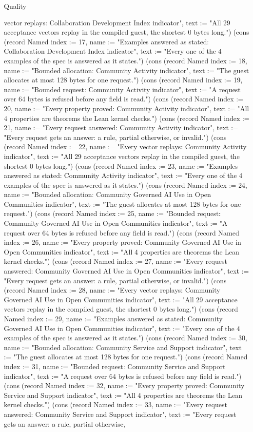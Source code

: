 \begin{lexlean}{Quality}
\begin{semanticmodule}
{vector replays: Collaboration Development Index indicator", text := "All 29 acceptance vectors replay in the compiled guest, the shortest 0 bytes long."}) (cons (record Named {index := 17, name := "Examples answered as stated: Collaboration Development Index indicator", text := "Every one of the 4 examples of the spec is answered as it states."}) (cons (record Named {index := 18, name := "Bounded allocation: Community Activity indicator", text := "The guest allocates at most 128 bytes for one request."}) (cons (record Named {index := 19, name := "Bounded request: Community Activity indicator", text := "A request over 64 bytes is refused before any field is read."}) (cons (record Named {index := 20, name := "Every property proved: Community Activity indicator", text := "All 4 properties are theorems the Lean kernel checks."}) (cons (record Named {index := 21, name := "Every request answered: Community Activity indicator", text := "Every request gets an answer: a rule, partial otherwise, or invalid."}) (cons (record Named {index := 22, name := "Every vector replays: Community Activity indicator", text := "All 29 acceptance vectors replay in the compiled guest, the shortest 0 bytes long."}) (cons (record Named {index := 23, name := "Examples answered as stated: Community Activity indicator", text := "Every one of the 4 examples of the spec is answered as it states."}) (cons (record Named {index := 24, name := "Bounded allocation: Community Governed AI Use in Open Communities indicator", text := "The guest allocates at most 128 bytes for one request."}) (cons (record Named {index := 25, name := "Bounded request: Community Governed AI Use in Open Communities indicator", text := "A request over 64 bytes is refused before any field is read."}) (cons (record Named {index := 26, name := "Every property proved: Community Governed AI Use in Open Communities indicator", text := "All 4 properties are theorems the Lean kernel checks."}) (cons (record Named {index := 27, name := "Every request answered: Community Governed AI Use in Open Communities indicator", text := "Every request gets an answer: a rule, partial otherwise, or invalid."}) (cons (record Named {index := 28, name := "Every vector replays: Community Governed AI Use in Open Communities indicator", text := "All 29 acceptance vectors replay in the compiled guest, the shortest 0 bytes long."}) (cons (record Named {index := 29, name := "Examples answered as stated: Community Governed AI Use in Open Communities indicator", text := "Every one of the 4 examples of the spec is answered as it states."}) (cons (record Named {index := 30, name := "Bounded allocation: Community Service and Support indicator", text := "The guest allocates at most 128 bytes for one request."}) (cons (record Named {index := 31, name := "Bounded request: Community Service and Support indicator", text := "A request over 64 bytes is refused before any field is read."}) (cons (record Named {index := 32, name := "Every property proved: Community Service and Support indicator", text := "All 4 properties are theorems the Lean kernel checks."}) (cons (record Named {index := 33, name := "Every request answered: Community Service and Support indicator", text := "Every request gets an answer: a rule, partial otherwise, }
\end{semanticmodule}
\end{lexlean}
